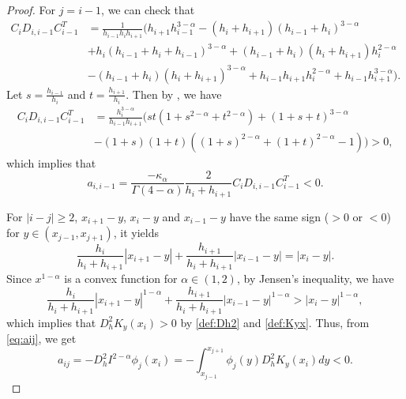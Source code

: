 \documentclass{amsart}
\theoremstyle{definition}
\theoremstyle{remark}
\numberwithin{equation}{section}
\begin{document}
\begin{proof}
 For \(j = i-1\), we can check that
 \begin{equation*}
     \begin{aligned}
         C_i D_{i,i-1} C_{i-1}^T
         &= \frac{1}{h_{i-1} h_{i} h_{i+1}} \Big(
            h_{i+1} h_{i-1}^{3-\alpha} - (h_{i}+h_{i+1})(h_{i-1}+h_{i})^{3-\alpha}     \\
            & + h_i(h_{i-1} + h_{i}  + h_{i-1})^{3-\alpha} + (h_{i-1}+h_{i}) (h_{i}+h_{i+1})h_i^{2-\alpha}  \\
            &- (h_{i-1}+h_{i})(h_{i} + h_{i+1})^{3-\alpha}  + h_{i-1} h_{i+1} h_{i}^{2-\alpha} + h_{i-1} h_{i+1}^{3-\alpha}
         \Big) .
     \end{aligned}
 \end{equation*}
 Let \(s = \frac{h_{i-1}}{h_{i}}\) and \(t=\frac{h_{i+1}}{h_{i}}\). 
 Then by , we have
 \begin{equation*}
     \begin{aligned}
         C_i D_{i,i-1} C_{i-1}^T &= \frac{ h_{i}^{3-\alpha }}{h_{i-1} h_{i+1}} 
         \Big( st(1+s^{2-\alpha} +t^{2-\alpha}) + (1+s+t)^{3-\alpha}    \\
         &- (1+s)(1+t)\left( (1+s)^{2-\alpha} + (1+t)^{2-\alpha} - 1 \right)  \Big) > 0  ,
     \end{aligned}
 \end{equation*}
 which implies that 
 \[a_{i, i-1} = \frac{-\kappa_\alpha}{\Gamma(4-\alpha)}\frac{2}{h_i+h_{i+1}} C_i D_{i,i-1} C_{i-1}^T < 0 .\]
 
 For $|i-j|\ge 2$, $x_{i+1} - y$, $x_{i} - y$ and $x_{i-1} - y$ have the same sign ($> 0$ or $< 0$) for $y\in (x_{j-1}, x_{j+1})$, it yields
 \begin{equation*}
     \frac{h_i}{h_{i}+h_{i+1}} |x_{i+1} - y| +  \frac{h_{i+1}}{h_{i}+h_{i+1}} |x_{i-1} - y| = |x_i - y|.
 \end{equation*}
 Since $x^{1-\alpha}$ is a convex function for $\alpha\in(1,2)$, by Jensen's inequality, we have
 \begin{equation*}
     \frac{h_i}{h_{i}+h_{i+1}} |x_{i+1} - y|^{1-\alpha} +  \frac{h_{i+1}}{h_{i}+h_{i+1}} |x_{i-1} - y|^{1-\alpha} > |x_i - y|^{1-\alpha},
 \end{equation*}
 which implies that \(D_h^2 K_y(x_i) > 0\) 
 by \eqref{def:Dh2} and \eqref{def:Kyx}.
 Thus, from \eqref{eq:aij}, we get
 \begin{equation*}
     a_{ij} = - D_h^2 I^{2-\alpha} \phi_j (x_i)
      = - \int_{x_{j-1}}^{x_{j+1}} \phi_j(y) D_h^2 K_y(x_i) dy < 0 .
 \end{equation*}



\end{proof}
\end{document}
